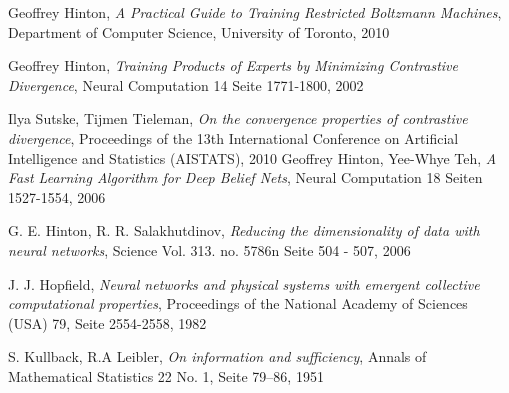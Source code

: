\documentclass[12pt]{article}
\begin{document}
\begin{thebibliography}{9}

Geoffrey Hinton,
\emph{A Practical Guide to Training Restricted Boltzmann Machines},
Department of Computer Science, 
University of Toronto,
2010

Geoffrey Hinton,
\emph{Training Products of Experts by Minimizing Contrastive Divergence},
Neural Computation 14 Seite 1771-1800,
2002

Ilya Sutske, Tijmen Tieleman,
\emph{On the convergence properties of contrastive divergence},
Proceedings of the 13th International Conference on Artificial Intelligence and Statistics (AISTATS),
2010 
Geoffrey Hinton, Yee-Whye Teh,
\emph{A Fast Learning Algorithm for Deep Belief Nets},
Neural Computation 18 Seiten 1527-1554,
2006

G. E. Hinton, R. R. Salakhutdinov,
\emph{Reducing the dimensionality of data with neural networks},
Science Vol. 313. no. 5786n Seite 504 - 507,
2006

J. J. Hopfield,
 \emph{Neural networks and physical systems with emergent collective computational properties},
Proceedings of the National Academy of Sciences (USA) 79, Seite 2554-2558,
1982

 S. Kullback, R.A Leibler,
\emph{On information and sufficiency},
Annals of Mathematical Statistics 22 No. 1,
Seite  79–86,
 1951
\end{thebibliography}
\end{document}
